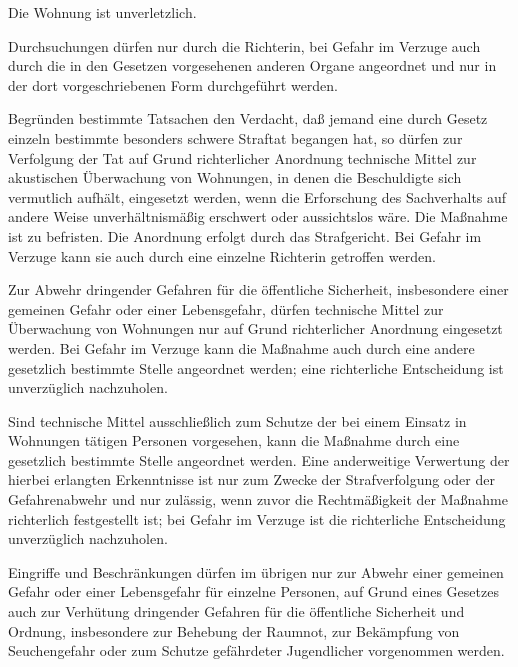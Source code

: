\documentclass{sasbase}
\begin{document}
\begin{article}[Privatsph\"{a}re]
	\item Die Wohnung ist unverletzlich.
	\item Durchsuchungen dürfen nur durch die Richterin, bei Gefahr im Verzuge auch durch die in den Gesetzen vorgesehenen anderen Organe angeordnet und nur in der dort vorgeschriebenen Form durchgeführt werden.
	\item Begründen bestimmte Tatsachen den Verdacht, daß jemand eine durch Gesetz einzeln bestimmte besonders schwere Straftat begangen hat, so dürfen zur Verfolgung der Tat auf Grund richterlicher Anordnung technische Mittel zur akustischen Überwachung von Wohnungen, in denen die Beschuldigte sich vermutlich aufhält, eingesetzt werden, wenn die Erforschung des Sachverhalts auf andere Weise unverhältnismäßig erschwert oder aussichtslos wäre. Die Maßnahme ist zu befristen. Die Anordnung erfolgt durch das Strafgericht. Bei Gefahr im Verzuge kann sie auch durch eine einzelne Richterin getroffen werden.
	\item Zur Abwehr dringender Gefahren für die öffentliche Sicherheit, insbesondere einer gemeinen Gefahr oder einer Lebensgefahr, dürfen technische Mittel zur Überwachung von Wohnungen nur auf Grund richterlicher Anordnung eingesetzt werden. Bei Gefahr im Verzuge kann die Maßnahme auch durch eine andere gesetzlich bestimmte Stelle angeordnet werden; eine richterliche Entscheidung ist unverzüglich nachzuholen.
	\item Sind technische Mittel ausschließlich zum Schutze der bei einem Einsatz in Wohnungen tätigen Personen vorgesehen, kann die Maßnahme durch eine gesetzlich bestimmte Stelle angeordnet werden. Eine anderweitige Verwertung der hierbei erlangten Erkenntnisse ist nur zum Zwecke der Strafverfolgung oder der Gefahrenabwehr und nur zulässig, wenn zuvor die Rechtmäßigkeit der Maßnahme richterlich festgestellt ist; bei Gefahr im Verzuge ist die richterliche Entscheidung unverzüglich nachzuholen.
	\item Eingriffe und Beschränkungen dürfen im übrigen nur zur Abwehr einer gemeinen Gefahr oder einer Lebensgefahr für einzelne Personen, auf Grund eines Gesetzes auch zur Verhütung dringender Gefahren für die öffentliche Sicherheit und Ordnung, insbesondere zur Behebung der Raumnot, zur Bekämpfung von Seuchengefahr oder zum Schutze gefährdeter Jugendlicher vorgenommen werden.
\end{article}
\end{document}
